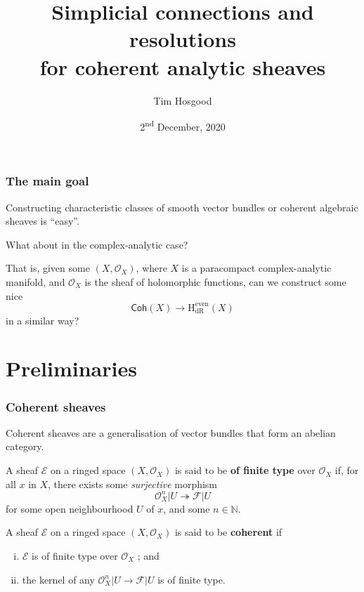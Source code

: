 \documentclass{beamer}
\title{Simplicial connections and resolutions\\for coherent analytic sheaves}
\author{Tim Hosgood}
\institute{Centre for Quantum Technologies (Singapore)\\Topos Institute (USA)}
\date{2\textsuperscript{nd} December, 2020}
\begin{document}
\begin{frame}
  \titlepage
\end{frame}

\begin{frame}\frametitle{The main goal}
  Constructing characteristic classes of smooth vector bundles or coherent algebraic sheaves is ``easy''.

  \pause

  What about in the complex-analytic case?

  \pause

  That is, given some $(X,\mathcal{O}_X)$, where $X$ is a paracompact complex-analytic manifold, and $\mathcal{O}_X$ is the sheaf of holomorphic functions, can we construct some nice
  \[
    \mathsf{Coh}(X) \to \mathrm{H}_\mathrm{dR}^\mathrm{even}(X)
  \]
  in a similar way?
\end{frame}


\section{Preliminaries}

  \begin{frame}\frametitle{Coherent sheaves}
    Coherent sheaves are a generalisation of vector bundles that form an abelian category.

    \pause

    \begin{definition}
      A sheaf $\mathscr{E}$ on a ringed space $(X,\mathcal{O}_X)$ is said to be \textbf{of finite type} over $\mathcal{O}_X$ if, for all $x$ in $X$, there exists some \emph{surjective} morphism
      \[
        \mathcal{O}_X^n|U \twoheadrightarrow \mathscr{F}|U
      \]
      for some open neighbourhood $U$ of $x$, and some $n\in\mathbb{N}$.
    \end{definition}

    \begin{definition}
      A sheaf $\mathscr{E}$ on a ringed space $(X,\mathcal{O}_X)$ is said to be \textbf{coherent} if
      \begin{enumerate}[(i)]
        \item $\mathscr{E}$ is of finite type over $\mathcal{O}_X$ ; and
        \item the kernel of any $\mathcal{O}_X^n|U \to \mathscr{F}|U$ is of finite type.
      \end{enumerate}
    \end{definition}
  \end{frame}
\end{document}
